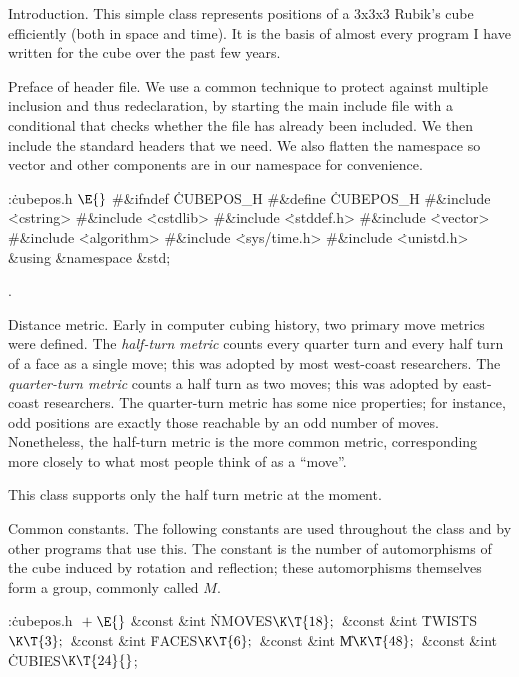 
\def\mod{\mathop{mod}}


Introduction.
This simple class represents positions of a 3x3x3 Rubik's cube
efficiently (both in space and time).  It is the basis of almost every
program I have written for the cube over the past few years.

\fi

Preface of header file.
We use a common technique to protect against multiple inclusion and
thus redeclaration, by starting the main include file with a
conditional that checks whether the file has already been included.
We then include the standard headers that we need.  We also flatten
the namespace so vector and other components are in our namespace
for convenience.

\Y\B\4:\.{cubepos.h }\X${}\E{}$\6
\8\#\&{ifndef} \.{CUBEPOS\_H}\6
\8\#\&{define} \.{CUBEPOS\_H}\6
\8\#\&{include} \.{<cstring>}\6
\8\#\&{include} \.{<cstdlib>}\6
\8\#\&{include} \.{<stddef.h>}\6
\8\#\&{include} \.{<vector>}\6
\8\#\&{include} \.{<algorithm>}\6
\8\#\&{include} \.{<sys/time.h>}\6
\8\#\&{include} \.{<unistd.h>}\6
\&{using} \&{namespace} \&{std};\par
{}.\fi

Distance metric.
Early in computer cubing history, two primary move metrics were
defined.  The {\it half-turn metric} counts every quarter turn and
every half turn of a face as a single move; this was adopted by most
west-coast researchers.  The {\it quarter-turn metric} counts a half
turn as two moves; this was adopted by east-coast researchers.  The
quarter-turn metric has some nice properties; for instance, odd
positions are exactly those reachable by an odd number of moves.
Nonetheless, the half-turn metric is the more common metric,
corresponding more closely to what most people think of as a ``move''.

This class supports only the half turn metric at the moment.

\fi

Common constants.
The following constants are used throughout the class and by other
programs that use this.  The  constant is the number of
automorphisms of the cube induced by rotation and reflection; these
automorphisms themselves form a group, commonly called $M$.

\Y\B\4:\.{cubepos.h }\X${}\mathrel+\E{}$\6
\&{const} \&{int} \.{NMOVES}${}\K\T{18};{}$\6
\&{const} \&{int} \.{TWISTS}${}\K\T{3};{}$\6
\&{const} \&{int} \.{FACES}${}\K\T{6};{}$\6
\&{const} \&{int} \|M${}\K\T{48};{}$\6
\&{const} \&{int} \.{CUBIES}${}\K\T{24}{}$;\par
\fi

